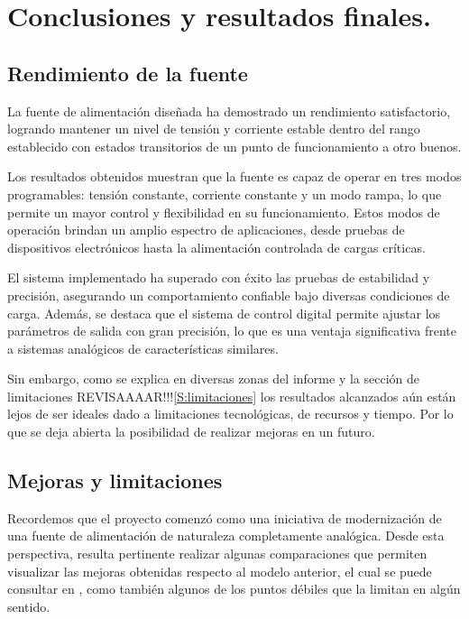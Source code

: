 \chapter{Conclusiones y resultados finales.}

\label{C:Conclusiones y resultados finales.}

\section{Rendimiento de la fuente} 
La fuente de alimentación diseñada ha demostrado un rendimiento satisfactorio, logrando mantener un nivel de tensión y corriente estable dentro del rango establecido con estados transitorios de un punto de funcionamiento a otro buenos. \par
Los resultados obtenidos muestran que la fuente es capaz de operar en tres modos programables: tensión constante, corriente constante y un modo rampa, lo que permite un mayor control y flexibilidad en su funcionamiento. Estos modos de operación brindan un amplio espectro de aplicaciones, desde pruebas de dispositivos electrónicos hasta la alimentación controlada de cargas críticas. \par
El sistema implementado ha superado con éxito las pruebas de estabilidad y precisión, asegurando un comportamiento confiable bajo diversas condiciones de carga. Además, se destaca que el sistema de control digital permite ajustar los parámetros de salida con gran precisión, lo que es una ventaja significativa frente a sistemas analógicos de características similares.\par
Sin embargo, como se explica en diversas zonas del informe y la sección de limitaciones REVISAAAAR!!!\ref{S:limitaciones} los resultados alcanzados aún están lejos de ser ideales dado a limitaciones tecnológicas, de recursos y tiempo. Por lo que se deja abierta la posibilidad de realizar mejoras en un futuro. \par

\section{Mejoras y limitaciones} 
Recordemos que el proyecto comenzó como una iniciativa de modernización de una fuente de alimentación de naturaleza completamente analógica. Desde esta perspectiva, resulta pertinente realizar algunas comparaciones que permiten visualizar las mejoras obtenidas respecto al modelo anterior, el cual se puede consultar en \cite{Fuente2023}, como también algunos de los puntos débiles que la limitan en algún sentido.\par

